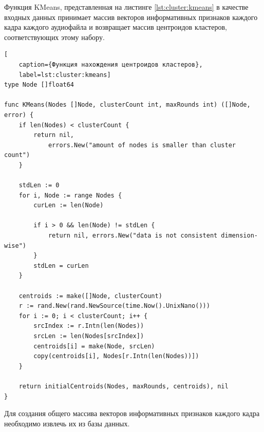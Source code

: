 Функция KMeans, представленная на листинге \ref{lst:cluster:kmeans} в качестве входных данных принимает массив векторов информативных признаков каждого кадра каждого аудиофайла и возвращает массив центроидов кластеров, соответствующих этому набору.
\begin{lstlisting}[
	caption={Функция нахождения центроидов кластеров},
	label=lst:cluster:kmeans]
type Node []float64

func KMeans(Nodes []Node, clusterCount int, maxRounds int) ([]Node, error) {
    if len(Nodes) < clusterCount {
        return nil, 
        	errors.New("amount of nodes is smaller than cluster count")
    }

    stdLen := 0
    for i, Node := range Nodes {
        curLen := len(Node)

        if i > 0 && len(Node) != stdLen {
            return nil, errors.New("data is not consistent dimension-wise")
        }
        stdLen = curLen
    }

    centroids := make([]Node, clusterCount)
    r := rand.New(rand.NewSource(time.Now().UnixNano()))
    for i := 0; i < clusterCount; i++ {
        srcIndex := r.Intn(len(Nodes))
        srcLen := len(Nodes[srcIndex])
        centroids[i] = make(Node, srcLen)
        copy(centroids[i], Nodes[r.Intn(len(Nodes))])
    }

    return initialCentroids(Nodes, maxRounds, centroids), nil
}
\end{lstlisting}
Для создания общего массива векторов информативных признаков каждого кадра необходимо извлечь их из базы данных. 

